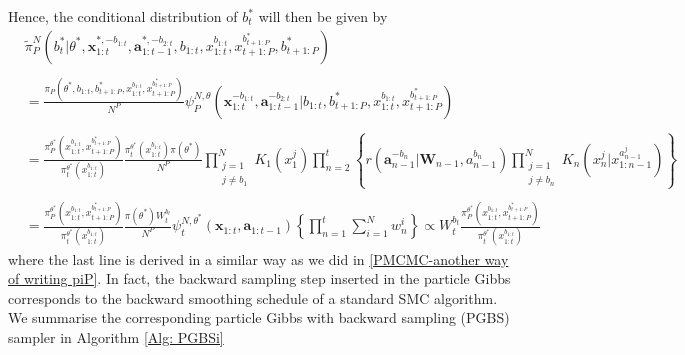 \documentclass[12pt,a4paper]{article}
\begin{document}
Hence, the conditional distribution of $b_t^{*}$ will then be given by 
\begin{equation}
    \label{PMCMC-PGBS conditional}
    \begin{split}
        &\tilde{\pi}_P^{N}(b_t^{*}|\theta^{*},\textbf{x}_{1:t}^{*,-b_{1:t}},\textbf{a}_{1:t-1}^{*,-b_{2:t}},b_{1:t},x_{1:t}^{b_{1:t}},x_{t+1:P}^{b_{t+1:P}^{*}},b_{t+1:P}^{*}) \\\\
        &=\frac{\pi_P(\theta^{*},b_{1:t},b_{t+1:P}^{*},x_{1:t}^{b_{1:t}},x_{t+1:P}^{b_{t+1:P}^{*}})}{N^P}\psi_{P}^{N,\theta}(\mathbf{x}_{1:t}^{-b_{1:t}},\mathbf{a}_{1:t-1}^{-b_{2:t}}|b_{1:t},b_{t+1:P}^{*},x_{1:t}^{b_{1:t}},x_{t+1:P}^{b_{t+1:P}^{*}})\\\\
        &=\frac{\pi_P^{\theta^{*}}(x_{1:t}^{b_{1:t}},x_{t+1:P}^{b_{t+1:P}^{*}})}{\pi_t^{\theta^{*}}(x_{1:t}^{b_{1:t}})}\frac{\pi_t^{\theta^{*}}(x_{1:t}^{b_{1:t}})\pi(\theta^{*})}{N^P}\prod_{\substack{j=1\\j \neq b_1}}^{N} K_1\left(x_1^j\right)\prod_{n=2}^t \left\{r\left(\mathbf{a}_{n-1}^{-b_{n}}|\mathbf{W}_{n-1},a_{n-1}^{b_n}\right)\prod_{\substack{j=1\\ j \neq b_n}}^{N} K_n(x_n^j|x_{1:n-1}^{a_{n-1}^j})\right\}\\\\
        &=\frac{\pi_P^{\theta^{*}}(x_{1:t}^{b_{1:t}},x_{t+1:P}^{b_{t+1:P}^{*}})}{\pi_t^{\theta^{*}}(x_{1:t}^{b_{1:t}})}\frac{\pi(\theta^{*})W_t^{b_t}}{N^P}\psi_t^{N,\theta^{*}}(\mathbf{x}_{1:t},\mathbf{a}_{1:t-1})\left\{\prod_{n=1}^{t}\sum_{i=1}^N w_n^i\right\} \propto W_t^{b_t} \frac{\pi_P^{\theta^{*}}(x_{1:t}^{b_{1:t}},x_{t+1:P}^{b_{t+1:P}^{*}})}{\pi_t^{\theta^{*}}(x_{1:t}^{b_{1:t}})}
    \end{split} 
\end{equation}
where the last line is derived in a similar way as we did in \eqref{PMCMC-another way of writing piP}. In fact, the backward sampling step inserted in the particle Gibbs corresponds to the backward smoothing schedule of a standard SMC algorithm. We summarise the corresponding particle Gibbs with backward sampling (PGBS) sampler in Algorithm \ref{Alg: PGBSi}
\end{document}
